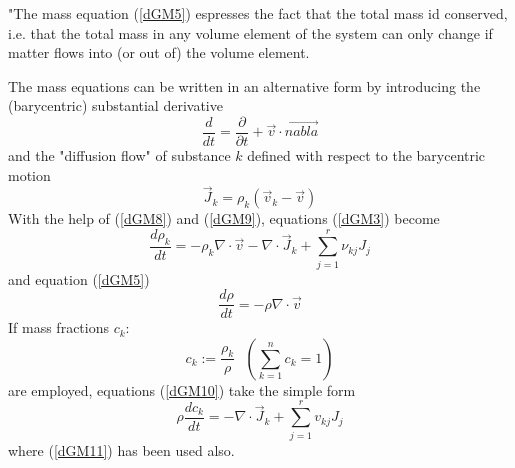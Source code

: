 "The mass equation (\ref{dGM5}) espresses the fact that the total mass id conserved, i.e. that the total mass in any volume element of the system can only change if matter flows into (or out of) the volume element.

The mass equations can be written in an alternative form by introducing the (barycentric) substantial derivative
\begin{equation}
\frac{d}{dt} = \frac{\partial}{\partial t} + \vec{v} \cdot \vec{nabla}
\label{dGM8}
\end{equation}
and the "diffusion flow" of substance $k$ defined with respect to the barycentric motion
\begin{equation}
\vec{J}_k = \rho_k (\vec{v}_k - \vec{v})
\label{dGM9}
\end{equation}
With the help of (\ref{dGM8}) and (\ref{dGM9}), equations (\ref{dGM3}) become
\begin{equation}
\frac{d \rho_k}{dt} = - \rho_k \nabla \cdot \vec{v} - \nabla \cdot \vec{J}_k + \sum_{j=1}^r \nu_{kj} J_j
\label{dGM10}
\end{equation}
and equation (\ref{dGM5})
\begin{equation}
\frac{d \rho}{dt} = - \rho \nabla \cdot \vec{v}
\label{dGM11}
\end{equation}
If mass fractions $c_k$:
\begin{equation}
c_k := \frac{\rho_k}{\rho} \ \ \ \left( \sum_{k=1}^n c_k =1 \right)
\end{equation}
are employed, equations (\ref{dGM10}) take the simple form
\begin{equation}
\rho \frac{dc_k}{dt} = - \nabla \cdot \vec{J}_k + \sum_{j=1}^r v_{kj} J_j
\end{equation}
where (\ref{dGM11}) has been used also.